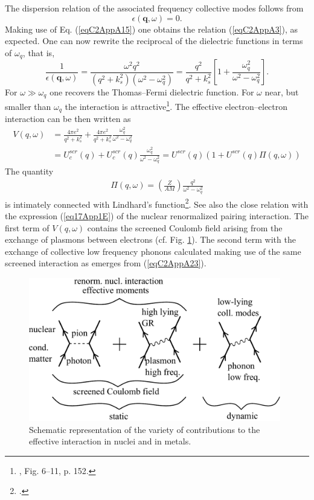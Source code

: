 \begin{subappendices}
The dispersion relation of the associated frequency collective modes follows from
\begin{equation}\label{eqC2AppA21}
\epsilon(\mathbf q,\omega)=0.
\end{equation}
Making use of Eq. (\ref{eqC2AppA15}) one obtains the relation (\ref{eqC2AppA3}), as expected. One can now rewrite the reciprocal of the dielectric functions in terms of $\omega_{q}$, that is,
\begin{equation}\label{eqC2AppA22}
\frac{1}{\epsilon(\mathbf q,\omega)}=\frac{\omega^2q^2}{(q^2+k_s^2)(\omega^2-\omega^2_{q})}=\frac{q^2}{q^2+k_s^2}\left[1+\frac{\omega_q^2}{\omega^2-\omega_q^2}\right].
\end{equation}
For $\omega\gg \omega_q$ one recovers the Thomas--Fermi dielectric function. For $\omega$ near, but smaller than $\omega_q$ the interaction is attractive\footnote{\cite{Schrieffer:64}, Fig. 6--11, p. 152.}. The effective electron--electron interaction can be then written as
\begin{align}\label{eqC2AppA23}
\nonumber V(q,\omega)&=\frac{4\pi  e^2}{q^2+k_s^2}+\frac{4\pi  e^2}{q^2+k_s^2}\frac{\omega_q^2}{\omega^2-\omega_q^2}\\
&=U^{scr}_c(q)+U_c^{scr}(q)\frac{\omega_q^2}{\omega^2-\omega_q^2}=U^{scr}(q)\left(1+U^{scr}(q)\Pi(q,\omega)\right)
\end{align}
The quantity 
\begin{align}\label{eqC2AppA24}
\Pi(q,\omega)=\left(\frac{Z}{AM}\right)\frac{q^2}{\omega^2-\omega_q^2}
\end{align}
is intimately connected with Lindhard's function\footnote{\cite{Lindhard:53}.}. See also the close relation with the expression (\ref{eq17App1E}) of the nuclear renormalized pairing interaction. The first term of $V(q,\omega)$ contains the screened Coulomb field arising from the exchange of plasmons between electrons (cf. Fig. \ref{fig3.A.4}). The second term with the exchange of collective low frequency phonons calculated making use of the same screened interaction as emerges from (\ref{eqC2AppA23}). 
   \begin{figure}
   	\centerline{\includegraphics*[width=11cm,angle=0	]{nutshell/figs/fig3A4}}
   	\caption{Schematic representation of the variety of contributions to the effective interaction in nuclei and in metals.}\label{fig3.A.4}
   \end{figure}


\end{subappendices}
